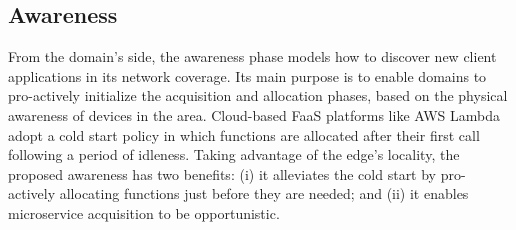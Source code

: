\subsection{Awareness}\label{sec:A3-E-awareness}


From the domain's side, the awareness phase models how to discover new client applications in its network coverage. Its main purpose is to enable domains to pro-actively initialize the acquisition and allocation phases, based on the physical awareness of devices in the area. Cloud-based FaaS platforms like AWS Lambda adopt a cold start policy in which functions are allocated after their first call following a period of idleness. Taking advantage of the edge's locality, the proposed awareness has two benefits: (i) it alleviates the cold start by pro-actively allocating functions just before they are needed; and (ii) it enables microservice acquisition to be opportunistic.


